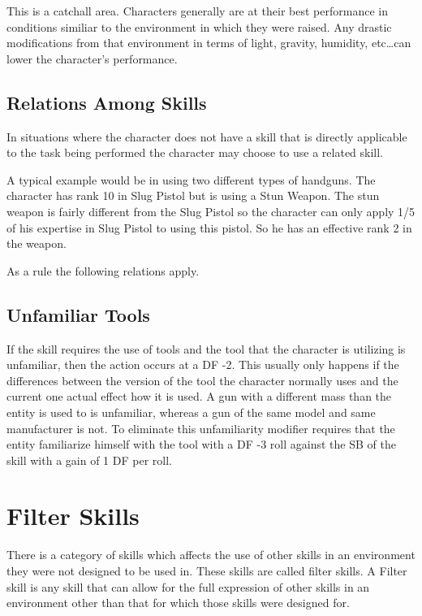 This is a catchall area. Characters generally are at their best 
performance in conditions similiar to the environment in which they 
were raised. Any drastic modifications from that environment in 
terms of light, gravity, humidity, etc\dots can lower the character's 
performance.



\subsection{Relations Among Skills}

In situations where the character does not have a skill that
is directly applicable to the task being performed the character 
may choose to use a related skill.

A typical example would be in using two different types of handguns. The
character has rank 10 in Slug Pistol but is using a Stun Weapon. The stun
weapon is fairly different from the Slug Pistol so the character can only
apply 1/5 of his expertise in Slug Pistol to using this pistol. So he has
an effective rank 2 in the weapon.

As a rule the following relations apply.


\subsection{Unfamiliar Tools}

If the skill requires the use of tools and the tool that the character is
utilizing is unfamiliar, then the action occurs at a DF -2. This usually
only happens if the differences between the version of the tool the
character normally uses and the current one actual effect how it is
used. A gun with a different mass than the entity is used to is
unfamiliar, whereas a gun of the same model and same manufacturer is
not. To eliminate this unfamiliarity modifier requires that the entity
familiarize himself with the tool with a DF -3 roll against the SB of 
the skill with a gain of 1 DF per roll. 

\section{Filter Skills}

There is a category of skills which affects the use of other skills 
in an environment they were not designed to be used in. These skills 
are called filter skills. A Filter skill is any skill that can allow 
for the full expression of other skills in an environment other than 
that for which those skills were designed for.

